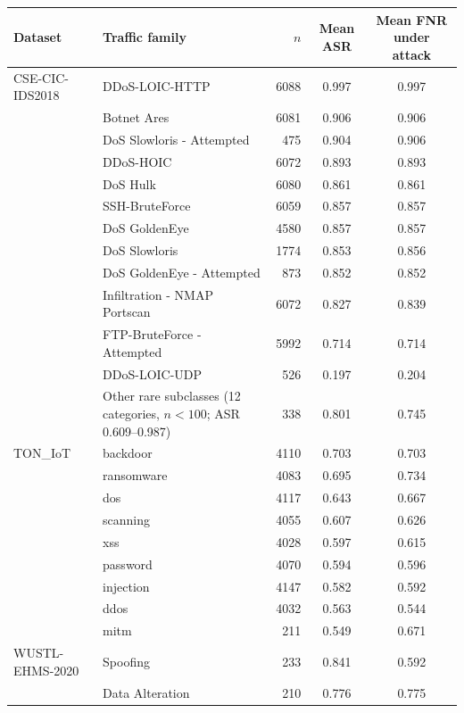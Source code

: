 \begin{tabular}{l l r c c}
\toprule
\textbf{Dataset} & \textbf{Traffic family} & $n$ & \textbf{Mean ASR} & \textbf{Mean FNR under attack} \\
\midrule
CSE-CIC-IDS2018 & DDoS-LOIC-HTTP & 6088 & 0.997 & 0.997 \\
 & Botnet Ares & 6081 & 0.906 & 0.906 \\
 & DoS Slowloris - Attempted & 475 & 0.904 & 0.906 \\
 & DDoS-HOIC & 6072 & 0.893 & 0.893 \\
 & DoS Hulk & 6080 & 0.861 & 0.861 \\
 & SSH-BruteForce & 6059 & 0.857 & 0.857 \\
 & DoS GoldenEye & 4580 & 0.857 & 0.857 \\
 & DoS Slowloris & 1774 & 0.853 & 0.856 \\
 & DoS GoldenEye - Attempted & 873 & 0.852 & 0.852 \\
 & Infiltration - NMAP Portscan & 6072 & 0.827 & 0.839 \\
 & FTP-BruteForce - Attempted & 5992 & 0.714 & 0.714 \\
 & DDoS-LOIC-UDP & 526 & 0.197 & 0.204 \\
 & Other rare subclasses (12 categories, $n < 100$; ASR 0.609--0.987) & 338 & 0.801 & 0.745 \\
TON\_IoT & backdoor & 4110 & 0.703 & 0.703 \\
 & ransomware & 4083 & 0.695 & 0.734 \\
 & dos & 4117 & 0.643 & 0.667 \\
 & scanning & 4055 & 0.607 & 0.626 \\
 & xss & 4028 & 0.597 & 0.615 \\
 & password & 4070 & 0.594 & 0.596 \\
 & injection & 4147 & 0.582 & 0.592 \\
 & ddos & 4032 & 0.563 & 0.544 \\
 & mitm & 211 & 0.549 & 0.671 \\
WUSTL-EHMS-2020 & Spoofing & 233 & 0.841 & 0.592 \\
 & Data Alteration & 210 & 0.776 & 0.775 \\
\bottomrule
\end{tabular}
